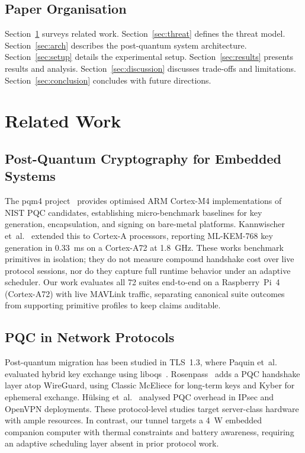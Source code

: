 \documentclass[conference]{IEEEtran}
\newcommand{\etal}{et~al.\xspace}
\begin{document}
\subsection{Paper Organisation}

Section~\ref{sec:related} surveys related work.
Section~\ref{sec:threat} defines the threat model.
Section~\ref{sec:arch} describes the post-quantum system architecture.
Section~\ref{sec:setup} details the experimental setup.
Section~\ref{sec:results} presents results and analysis.
Section~\ref{sec:discussion} discusses trade-offs and limitations.
Section~\ref{sec:conclusion} concludes with future directions.

\section{Related Work}
\label{sec:related}

\subsection{Post-Quantum Cryptography for Embedded Systems}

The pqm4 project~\cite{pqm4} provides optimised ARM Cortex-M4 implementations of NIST PQC candidates, establishing micro-benchmark baselines for key generation, encapsulation, and signing on bare-metal platforms.
Kannwischer \etal~\cite{pqc-arm-bench} extended this to Cortex-A processors, reporting ML-KEM-768 key generation in \SI{0.33}{\milli\second} on a Cortex-A72 at \SI{1.8}{\giga\hertz}.
These works benchmark primitives in isolation; they do not measure compound handshake cost over live protocol sessions, nor do they capture full runtime behavior under an adaptive scheduler.
Our work evaluates all 72 suites end-to-end on a Raspberry~Pi~4 (Cortex-A72) with live MAVLink traffic, separating canonical suite outcomes from supporting primitive profiles to keep claims auditable.

\subsection{PQC in Network Protocols}

Post-quantum migration has been studied in TLS~1.3, where Paquin \etal~\cite{pqc-tls-bench} evaluated hybrid key exchange using liboqs~\cite{liboqs}.
Rosenpass~\cite{rosenpass} adds a PQC handshake layer atop WireGuard, using Classic McEliece for long-term keys and Kyber for ephemeral exchange.
Hülsing \etal~\cite{pqc-vpn} analysed PQC overhead in IPsec and OpenVPN deployments.
These protocol-level studies target server-class hardware with ample resources.
In contrast, our tunnel targets a \SI{4}{\watt} embedded companion computer with thermal constraints and battery awareness, requiring an adaptive scheduling layer absent in prior protocol work.
\end{document}
